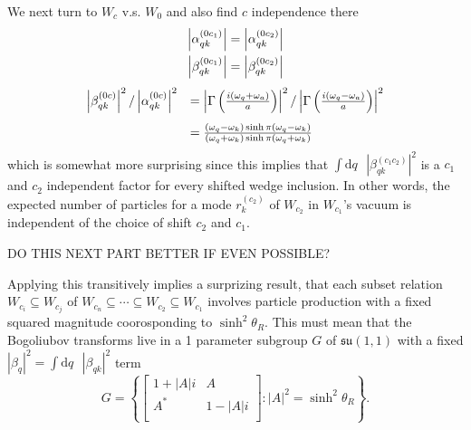 \documentclass[12pt,a4paper]{article}
\newcommand{\dv}[1]{\mathrm{d} #1 \text{ }}
\begin{document}
We next turn to $W_c$ v.s. $W_0$ and also find $c$ independence there 
\begin{equation}
  \begin{array}{c}
    \left|\alpha_{qk}^{(0c_1)}\right| = \left|\alpha_{qk}^{(0c_2)}\right| \vspace{4pt}\\
    \left|\beta_{qk}^{(0c_1)}\right| = \left|\beta_{qk}^{(0c_2)}\right| \\
  \end{array}
\end{equation}
\begin{equation}
  \begin{array}{ll}
      \left|\beta_{qk}^{(0c)}\right|^2 / \left|\alpha_{qk}^{(0c)}\right|^2 \vspace{4pt} &= \left|\Gamma\left(\frac{i(\omega_q + \omega_a)}{a}\right)\right|^2 / \left|\Gamma\left(\frac{i(\omega_q - \omega_a)}{a}\right)\right|^2 \vspace{4pt} \\
  & = \frac{(\omega_q - \omega_k) \sinh \pi (\omega_q - \omega_k)}{(\omega_q + \omega_k) \sinh \pi (\omega_q + \omega_k)} \\
  \end{array}
\end{equation}
which is somewhat more surprising since this implies that $\int \dv{q} \left|\beta_{qk}^{(c_1c_2)}\right|^2$ is a $c_1$ and $c_2$ independent factor  for every shifted wedge inclusion.  In other words, the expected number of particles for a mode $r^{(c_2)}_k$ of $W_{c_2}$ in $W_{c_1}$'s vacuum is independent of the choice of shift $c_2$ and $c_1$.


DO THIS NEXT PART BETTER IF EVEN POSSIBLE?


Applying this transitively implies a surprizing result, that each subset relation $W_{c_i} \subseteq W_{c_j}$ of $W_{c_n} \subseteq \cdots \subseteq W_{c_2} \subseteq W_{c_1}$ involves particle production with a fixed squared magnitude coorosponding to $\sinh^2 \theta_R$. This must mean that the Bogoliubov transforms live in a 1 parameter subgroup $G$ of $\mathfrak{su}(1,1)$ with a fixed $|\beta_q|^2 = \int \dv{q} \left|\beta_{qk}\right|^2$ term
\begin{equation}
  G = \left\{
  \begin{bmatrix}
    1 + |A|i & A \\
    A^* & 1 - |A|i \\
  \end{bmatrix} : |A|^2 = \sinh^2 \theta_R
  \right\}.
\end{equation}
\end{document}
